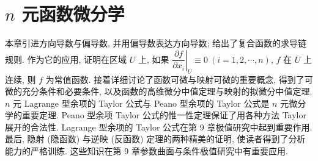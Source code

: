 
\chapter{\texorpdfstring{$n$}{n} 元函数微分学}\label{ch:8}

本章引进方向导数与偏导数, 并用偏导数表达方向导数; 给出了复合函数的求导链规则. 作为它的应用, 证明在区域 $U$ 上, 如果 $\left.\dfrac{\partial f}{\partial x_{i}}\right|_{U} \equiv 0\ (i = 1, 2, \cdots, n)$, $f$ 在 $\overline{U}$ 上连续, 则 $f$ 为常值函数. 接着详细讨论了函数可微与映射可微的重要概念, 得到了可微的充分条件和必要条件, 以及函数的高维微分中值定理与映射的拟微分中值定理. $n$ 元 Lagrange 型余项的 Taylor 公式与 Peano 型余项的 Taylor 公式是 $n$ 元微分学的重要定理. Peano 型余项 Taylor 公式的惟一性定理保证了用各种方法 Taylor 展开的合法性. Lagrange 型余项的 Taylor 公式在第 9 章极值研究中起到重要作用. 最后, 隐射 (隐函数) 与逆映 (反函数) 定理的两种精美的证明, 使读者得到了分析能力的严格训练. 这些知识在第 9 章参数曲面与条件极值研究中有重要应用.








